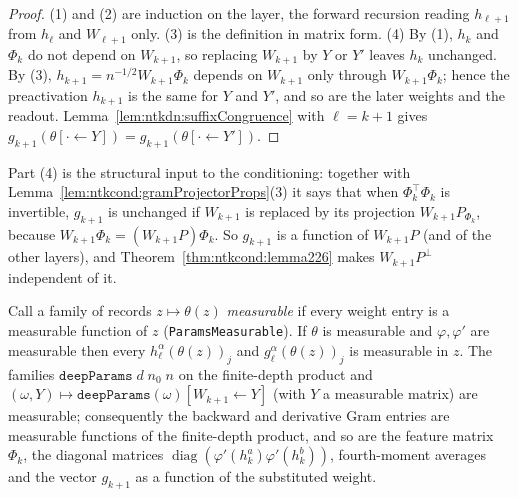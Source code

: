 \begin{proof}
  \leanok
(1) and (2) are induction on the layer, the forward recursion reading $h_{\ell+1}$ from $h_\ell$ and $W_{\ell+1}$ only. (3) is the definition in matrix form. (4) By (1), $h_k$ and $\Phi_k$ do not depend on $W_{k+1}$, so replacing $W_{k+1}$ by $Y$ or $Y'$ leaves $h_k$ unchanged. By (3), $h_{k+1}=n^{-1/2}W_{k+1}\Phi_k$ depends on $W_{k+1}$ only through $W_{k+1}\Phi_k$; hence the preactivation $h_{k+1}$ is the same for $Y$ and $Y'$, and so are the later weights and the readout. Lemma~\ref{lem:ntkdn:suffixCongruence} with $\ell=k+1$ gives $g_{k+1}(\theta[\cdot\leftarrow Y])=g_{k+1}(\theta[\cdot\leftarrow Y'])$.
\end{proof}

Part (4) is the structural input to the conditioning: together with Lemma~\ref{lem:ntkcond:gramProjectorProps}(3) it says that when $\Phi_k^\top\Phi_k$ is invertible, $g_{k+1}$ is unchanged if $W_{k+1}$ is replaced by its projection $W_{k+1}P_{\Phi_k}$, because $W_{k+1}\Phi_k=(W_{k+1}P)\Phi_k$. So $g_{k+1}$ is a function of $W_{k+1}P$ (and of the other layers), and Theorem~\ref{thm:ntkcond:lemma226} makes $W_{k+1}P^\perp$ independent of it.

\begin{lemma}\label{lem:ntkdn:measurable}
  \leanok
Call a family of records $z\mapsto\theta(z)$ \emph{measurable} if every weight entry is a
measurable function of $z$ (\texttt{ParamsMeasurable}). If $\theta$ is measurable and
$\varphi,\varphi'$ are measurable then every $h_\ell^\alpha(\theta(z))_j$ and
$g_\ell^\alpha(\theta(z))_j$ is measurable in $z$. The families
$\texttt{deepParams}\;d\;n_0\;n$ on the finite-depth product and
$(\omega,Y)\mapsto\texttt{deepParams}(\omega)[W_{k+1}\leftarrow Y]$ (with $Y$ a measurable
matrix) are measurable; consequently the backward and derivative Gram entries are measurable
functions of the finite-depth product, and so are the feature matrix $\Phi_k$, the diagonal matrices
$\operatorname{diag}(\varphi'(h_k^a)\varphi'(h_k^b))$, fourth-moment averages and the vector
$g_{k+1}$ as a function of the substituted weight.
\end{lemma}

